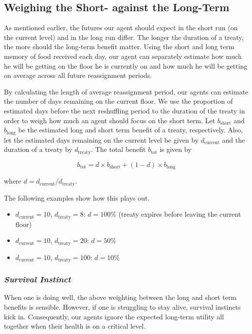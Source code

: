 \subsection{Weighing the Short- against the Long-Term}

As mentioned earlier, the futures our agent should expect in the short run (on the current level) and in the long run differ. The longer the duration of a treaty, the more should the long-term benefit matter. Using the short and long term memory of food received each day, our agent can separately estimate how much he will be getting on the floor he is currently on and how much he will be getting on average across all future reassignment periods.

By calculating the length of average reassignment period, our agents can estimate the number of days remaining on the current floor. We use the proportion of estimated days before the next reshuffling period to the duration of the treaty in order to weigh how much an agent should focus on the short term. Let $b_\text{short}$ and $b_\text{long}$ be the estimated long and short term benefit of a treaty, respectively. Also, let the estimated days remaining on the current level be given by $d_\text{current}$ and the duration of a treaty by $d_\text{treaty}$. The total benefit $b_\text{tot}$ is given by

\begin{equation}
b_\text{tot} = d\times b_\text{short} + (1-d)\times b_\text{long}    
\label{eq:shortlongweight}
\end{equation}

where $d = d_\text{current}/d_\text{treaty}$.

The following examples show how this plays out.

\begin{itemize}
    \item $d_\text{current} = 10$, $d_\text{treaty} = 8$:  $d=100\%$ (treaty expires before leaving the current floor)
    \item $d_\text{current} = 10$, $d_\text{treaty} = 20$: $d=50\%$
    \item $d_\text{current} = 10$, $d_\text{treaty} = 100$: $d = 10\%$
\end{itemize}


\subsubsection{\textit{Survival Instinct}}

When one is doing well, the above weighting between the long and short term benefits is sensible. However, if one is struggling to stay alive, survival instincts kick in. Consequently, our agents ignore the expected long-term utility all together when their health is on a critical level.

